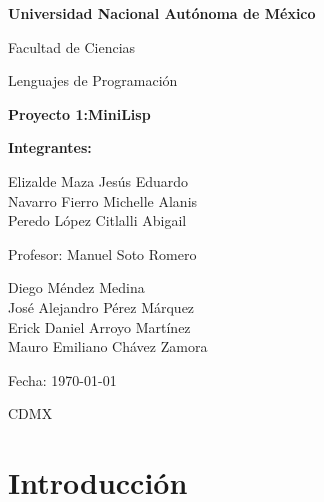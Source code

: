 \documentclass[a4paper,12pt]{article}
\begin{document}
\begin{titlepage}
    \centering
    {\Large \textbf{Universidad Nacional Autónoma de México} \par}
    \vspace{0.5cm}
    {\large Facultad de Ciencias \par}
    \vspace{0.5cm}
    {\large Lenguajes de Programación \par}

    \vfill

    {\Huge \textbf{Proyecto 1:MiniLisp} \par}
    \vspace{1.5cm}

  
    \begin{flushleft}
    \textbf{Integrantes:}
    \end{flushleft}
    
    \begin{center}
    Elizalde Maza Jesús Eduardo \\
    Navarro Fierro Michelle Alanis \\
    Peredo López Citlalli Abigail \\
    \end{center}

    \vfill

    {\large Profesor: Manuel Soto Romero \par}
    \vspace{0.5cm}
    \begin{center}
        Diego Méndez Medina\\
        José Alejandro Pérez Márquez\\
        Erick Daniel Arroyo Martínez\\
        Mauro Emiliano Chávez Zamora\\
    \end{center}
    {\large Fecha: \today \par}
    \vspace{0.5cm}
    {\large CDMX \par}
\end{titlepage}

\newpage
\tableofcontents
\newpage  %

\newpage
\section{Introducción}
\end{document}
